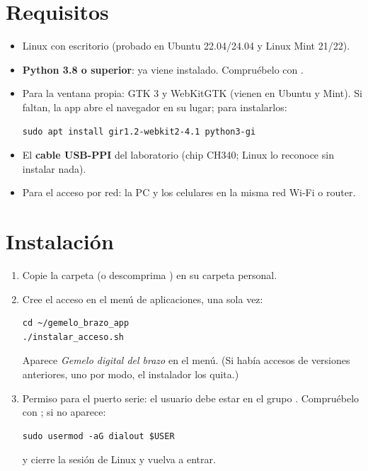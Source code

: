 \documentclass[a4paper,11pt]{article}
\begin{document}
\section{Requisitos}
\begin{itemize}
\item Linux con escritorio (probado en Ubuntu 22.04/24.04 y Linux Mint 21/22).
\item \textbf{Python 3.8 o superior}: ya viene instalado. Compruébelo con .
\item Para la ventana propia: GTK 3 y WebKitGTK (vienen en Ubuntu y Mint). Si faltan, la app abre el navegador en su lugar; para instalarlos:
\begin{lstlisting}
sudo apt install gir1.2-webkit2-4.1 python3-gi
\end{lstlisting}
\item El \textbf{cable USB-PPI} del laboratorio (chip CH340; Linux lo reconoce sin instalar nada).
\item Para el acceso por red: la PC y los celulares en la misma red Wi-Fi o router.
\end{itemize}

\section{Instalación}
\begin{enumerate}
\item Copie la carpeta  (o descomprima ) en su carpeta personal.
\item Cree el acceso en el menú de aplicaciones, una sola vez:
\begin{lstlisting}
cd ~/gemelo_brazo_app
./instalar_acceso.sh
\end{lstlisting}
Aparece \emph{Gemelo digital del brazo} en el menú. (Si había accesos de versiones anteriores, uno por modo, el instalador los quita.)
\item Permiso para el puerto serie: el usuario debe estar en el grupo . Compruébelo con ; si no aparece:
\begin{lstlisting}
sudo usermod -aG dialout $USER
\end{lstlisting}
y cierre la sesión de Linux y vuelva a entrar.
\end{enumerate}

\end{document}
